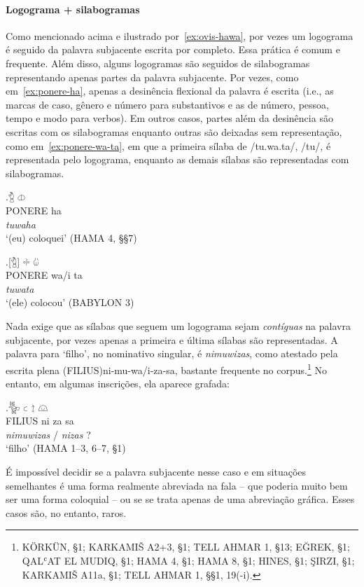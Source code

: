 \paragraph{Logograma + silabogramas}
Como mencionado acima e ilustrado por~\ref{ex:ovis-hawa}, por vezes um logograma
é seguido da palavra subjacente escrita por completo. Essa prática é comum e
frequente.
Além disso, alguns logogramas são seguidos de silabogramas representando apenas
partes da palavra subjacente.
Por vezes, como em~\ref{ex:ponere-ha}, apenas a desinência flexional da
palavra é escrita (i.e., as marcas de caso, gênero e número para substantivos e
as de número, pessoa, tempo e modo para verbos).
Em outros casos, partes além da desinência são escritas com os silabogramas
enquanto outras são deixadas sem representação, como em~\ref{ex:ponere-wa-ta},
em que a primeira sílaba de /tu.wa.ta/, /tu/, é representada pelo logograma,
enquanto as demais sílabas são representadas com silabogramas.

\exg.\label{ex:ponere-ha}\Large 𔑇 \Large 𔓷\\
PONERE ha\\
\emph{tuwaha}\\
`(eu) coloquei' (HAMA 4, §§7)

\exg.\label{ex:ponere-wa-ta}\Large [𔑇] \Large 𔗬 \Large 𔑰\\
PONERE wa/i ta\\
\emph{tuwata}\\
`(ele) colocou' (BABYLON 3)


\noindent Nada exige que as sílabas que seguem um logograma sejam
\emph{contíguas} na palavra subjacente, por vezes apenas a primeira e última
sílabas são representadas.
A palavra para `filho', no nominativo singular, é \emph{nimuwizas}, como
atestado pela escrita plena {(FILIUS)}ni-mu-wa/i-za-sa, bastante frequente no
corpus.\footnote{KÖRKÜN, §1; KARKAMIŠ A2+3, §1; TELL AHMAR 1, §13; EĞREK, §1;
	QAL\textsc{ʿ}AT EL MUDIQ, §1; HAMA 4, §1; HAMA 8, §1; HINES, §1; ŞIRZI, §1;
	KARKAMIŠ A11a, §1; TELL AHMAR 1, §§1, 19(-i).}
No entanto, em algumas inscrições, ela aparece grafada:

\exg.\Large 𔐰 \Large 𔗐 \Large 𔖪 \Large 𔗔\\
FILIUS ni za sa\\
\emph{nimuwizas} \slash{} \emph{nizas}{ }?\\
`filho' (HAMA 1–3, 6–7, §1)

É impossível decidir se a palavra subjacente nesse caso e em situações
semelhantes é uma forma realmente abreviada na fala  -- que poderia muito bem ser
uma forma coloquial -- ou se se trata apenas de uma abreviação gráfica.
Esses casos são, no entanto, raros.

